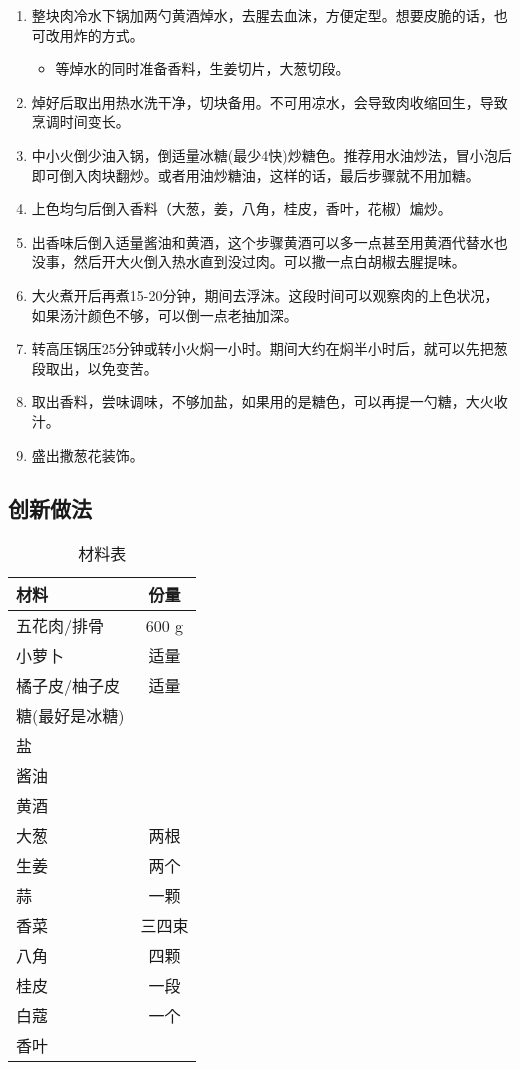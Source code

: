 \begin{enumerate}
    \item 整块肉冷水下锅加两勺黄酒焯水，去腥去血沫，方便定型。想要皮脆的话，也可改用炸的方式。
    \begin{itemize}
        \item 等焯水的同时准备香料，生姜切片，大葱切段。
    \end{itemize}
    \item 焯好后取出用热水洗干净，切块备用。不可用凉水，会导致肉收缩回生，导致烹调时间变长。
    \item 中小火倒少油入锅，倒适量冰糖(最少4快)炒糖色。推荐用水油炒法，冒小泡后即可倒入肉块翻炒。或者用油炒糖油，这样的话，最后步骤就不用加糖。
    \item 上色均匀后倒入香料（大葱，姜，八角，桂皮，香叶，花椒）煸炒。
    \item 出香味后倒入适量酱油和黄酒，这个步骤黄酒可以多一点甚至用黄酒代替水也没事，然后开大火倒入热水直到没过肉。可以撒一点白胡椒去腥提味。
    \item 大火煮开后再煮15-20分钟，期间去浮沫。这段时间可以观察肉的上色状况，如果汤汁颜色不够，可以倒一点老抽加深。
    \item 转高压锅压25分钟或转小火焖一小时。期间大约在焖半小时后，就可以先把葱段取出，以免变苦。
    \item 取出香料，尝味调味，不够加盐，如果用的是糖色，可以再提一勺糖，大火收汁。
    \item 盛出撒葱花装饰。
\end{enumerate}

\subsection{创新做法}

\begin{table}[h]
    \centering
    \begin{tabular}{|l||c|}\hline
     \textbf{材料}    &  \textbf{份量}\\ \hline\hline
    五花肉/排骨     &  600 g \\ \hline
    小萝卜     &  适量 \\ \hline
    橘子皮/柚子皮     &  适量 \\ \hline
    糖(最好是冰糖)     &   \\ \hline
    盐     &    \\ \hline
    酱油     &   \\ \hline
    黄酒     &   \\ \hline
    大葱     &  两根 \\ \hline
    生姜     &  两个 \\ \hline
    蒜     &  一颗 \\ \hline
    香菜     &  三四束 \\ \hline
    八角     &  四颗 \\ \hline
    桂皮     &  一段\\ \hline
    白蔻     &  一个\\ \hline
    香叶     &   \\ \hline
    \end{tabular}
    \caption{材料表}
\end{table}

